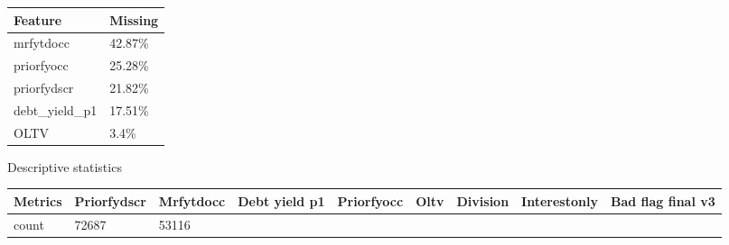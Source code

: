 \begin{longtable}[]{@{}ll@{}}
\toprule
Feature & Missing\tabularnewline
\midrule
\endhead
mrfytdocc & 42.87\%\tabularnewline
priorfyocc & 25.28\%\tabularnewline
priorfydscr & 21.82\%\tabularnewline
debt\_yield\_p1 & 17.51\%\tabularnewline
OLTV & 3.4\%\tabularnewline
\bottomrule
\end{longtable}

Descriptive statistics

\begin{longtable}[]{@{}lllllllll@{}}
\toprule
\begin{minipage}[b]{0.05\columnwidth}\raggedright
Metrics\strut
\end{minipage} & \begin{minipage}[b]{0.08\columnwidth}\raggedright
Priorfydscr\strut
\end{minipage} & \begin{minipage}[b]{0.09\columnwidth}\raggedright
Mrfytdocc\strut
\end{minipage} & \begin{minipage}[b]{0.09\columnwidth}\raggedright
Debt yield p1\strut
\end{minipage} & \begin{minipage}[b]{0.08\columnwidth}\raggedright
Priorfyocc\strut
\end{minipage} & \begin{minipage}[b]{0.09\columnwidth}\raggedright
Oltv\strut
\end{minipage} & \begin{minipage}[b]{0.09\columnwidth}\raggedright
Division\strut
\end{minipage} & \begin{minipage}[b]{0.08\columnwidth}\raggedright
Interestonly\strut
\end{minipage} & \begin{minipage}[b]{0.11\columnwidth}\raggedright
Bad flag final v3\strut
\end{minipage}\tabularnewline
\midrule
\endhead
\begin{minipage}[t]{0.05\columnwidth}\raggedright
count\strut
\end{minipage} & \begin{minipage}[t]{0.08\columnwidth}\raggedright
72687\strut
\end{minipage} & \begin{minipage}[t]{0.09\columnwidth}\raggedright
53116\strut
\end{minipage} & \begin{minipage}[t]{0.09\columnwidth}\raggedright

\end{minipage}
\end{longtable}

